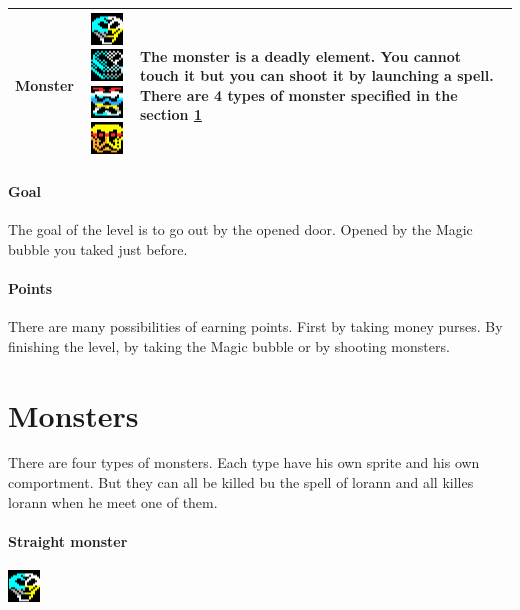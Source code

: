 \documentclass{report}
\begin{document}
\begin{center}
\begin{tabulary}{0.9\linewidth}{|c|c|L|}
\hline
Monster & \includegraphics[scale=0.7]{resources/sprites/monster_1.png}\includegraphics[scale=0.7]{resources/sprites/monster_2.png}\includegraphics[scale=0.7]{resources/sprites/monster_3.png}\includegraphics[scale=0.7]{resources/sprites/monster_4.png} & The monster is a deadly element. You cannot touch it but you can shoot it by launching a spell. There are 4 types of monster specified in the section \ref{monsters}\\
\hline
\end{tabulary}
\end{center}

\paragraph{Goal} The goal of the level is to go out by the opened door. Opened by the Magic bubble you taked just before.

\paragraph{Points} There are many possibilities of earning points. First by taking money purses. By finishing the level, by taking the Magic bubble or by shooting monsters.

\section{Monsters}
\label{monsters}

There are four types of monsters. Each type have his own sprite and his own comportment. But they can all be killed bu the spell of lorann and all killes lorann when he meet one of them.

\paragraph{Straight monster}
\hspace{\fill}\includegraphics{resources/sprites/monster_1.png}
\end{document}
